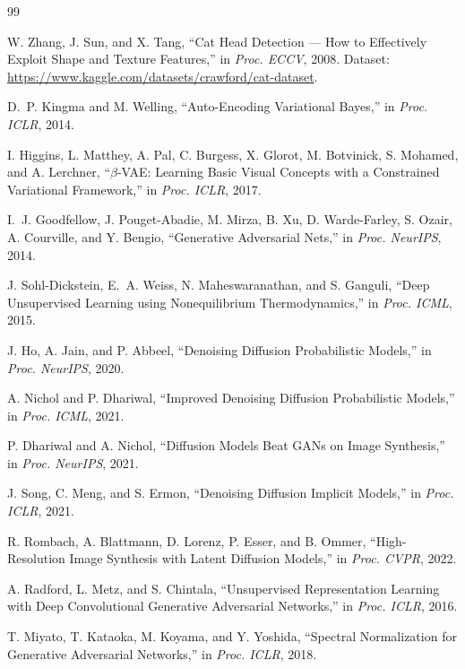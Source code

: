 \documentclass[11pt,a4paper]{article}
\begin{document}
\begin{thebibliography}{99}

W. Zhang, J. Sun, and X. Tang, ``Cat Head Detection --- How to Effectively Exploit Shape and Texture Features,'' in \textit{Proc. ECCV}, 2008. Dataset: \url{https://www.kaggle.com/datasets/crawford/cat-dataset}.

D.~P. Kingma and M. Welling, ``Auto-Encoding Variational Bayes,'' in \textit{Proc. ICLR}, 2014.

I. Higgins, L. Matthey, A. Pal, C. Burgess, X. Glorot, M. Botvinick, S. Mohamed, and A. Lerchner, ``$\beta$-VAE: Learning Basic Visual Concepts with a Constrained Variational Framework,'' in \textit{Proc. ICLR}, 2017.

I.~J. Goodfellow, J. Pouget-Abadie, M. Mirza, B. Xu, D. Warde-Farley, S. Ozair, A. Courville, and Y. Bengio, ``Generative Adversarial Nets,'' in \textit{Proc. NeurIPS}, 2014.

J. Sohl-Dickstein, E.~A. Weiss, N. Maheswaranathan, and S. Ganguli, ``Deep Unsupervised Learning using Nonequilibrium Thermodynamics,'' in \textit{Proc. ICML}, 2015.

J. Ho, A. Jain, and P. Abbeel, ``Denoising Diffusion Probabilistic Models,'' in \textit{Proc. NeurIPS}, 2020.

A. Nichol and P. Dhariwal, ``Improved Denoising Diffusion Probabilistic Models,'' in \textit{Proc. ICML}, 2021.

P. Dhariwal and A. Nichol, ``Diffusion Models Beat GANs on Image Synthesis,'' in \textit{Proc. NeurIPS}, 2021.

J. Song, C. Meng, and S. Ermon, ``Denoising Diffusion Implicit Models,'' in \textit{Proc. ICLR}, 2021.

R. Rombach, A. Blattmann, D. Lorenz, P. Esser, and B. Ommer, ``High-Resolution Image Synthesis with Latent Diffusion Models,'' in \textit{Proc. CVPR}, 2022.

A. Radford, L. Metz, and S. Chintala, ``Unsupervised Representation Learning with Deep Convolutional Generative Adversarial Networks,'' in \textit{Proc. ICLR}, 2016.

T. Miyato, T. Kataoka, M. Koyama, and Y. Yoshida, ``Spectral Normalization for Generative Adversarial Networks,'' in \textit{Proc. ICLR}, 2018.


\end{thebibliography}
\end{document}
